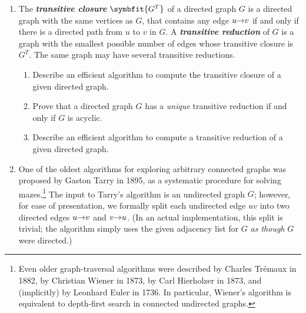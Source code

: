 \begin{exercises}
\begin{enumerate}[label=\arabic*.,ref=\thechapter.\arabic*,leftmargin=*,align=left,itemsep=1.5ex plus 0.5ex,start=0]
\item The \textbf{\textit{transitive closure}} $\symbfit{G^T}$ of a directed graph $G$ is a directed graph with the same vertices as $G$, that contains any edge $u\mathord{\rightarrow}v$ if and only if there is a directed path from $u$ to $v$ in $G$.
A \textbf{\textit{transitive reduction}} of $G$ is a graph with the smallest possible number of edges whose transitive closure is $G^T$.
The same graph may have several transitive reductions.
\begin{enumerate}
\item Describe an efficient algorithm to compute the transitive closure of a given directed graph.
\item Prove that a directed graph $G$ has a \textit{unique} transitive reduction if and only if $G$ is acyclic.
\item Describe an efficient algorithm to compute a transitive reduction of a given directed graph.
\end{enumerate}

\item One of the oldest algorithms for exploring arbitrary connected graphs was proposed by Gaston Tarry in 1895, as a systematic procedure for solving mazes.\footnote{Even older graph-traversal algorithms were described by Charles Trémaux in 1882, by Christian Wiener in 1873, by Carl Hierholzer in 1873, and (implicitly) by Leonhard Euler in 1736. In particular, Wiener’s algorithm is equivalent to depth-first search in connected undirected graphs.}
The input to Tarry’s algorithm is an undirected graph $G$; however, for ease of presentation, we formally split each undirected edge $uv$ into two directed edges $u\mathord{\rightarrow}v$ and $v\mathord{\rightarrow}u$.
(In an actual implementation, this split is trivial; the algorithm simply uses the given adjacency list for $G$ \textit{as though} $G$ were directed.)


\end{enumerate}
\end{exercises}
